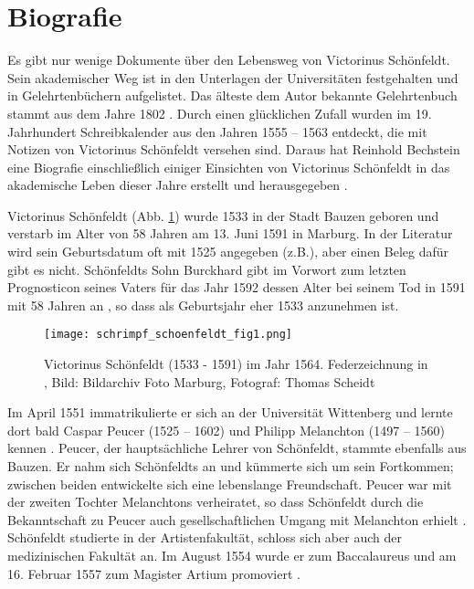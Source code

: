 \documentclass[12pt]{article}
\begin{document}
\section{Biografie}

Es gibt nur wenige Dokumente über den Lebensweg von Victorinus Schönfeldt. Sein akademischer Weg ist in den Unterlagen der Universitäten festgehalten und in Gelehrtenbüchern aufgelistet. Das älteste dem Autor bekannte Gelehrtenbuch stammt aus dem Jahre 1802 \cite{Strieder1802}. Durch einen glücklichen Zufall wurden im 19. Jahrhundert Schreibkalender aus den Jahren 1555 -- 1563 entdeckt, die mit Notizen von Victorinus Schönfeldt versehen sind. Daraus hat Reinhold Bechstein eine Biografie einschließlich einiger Einsichten von Victorinus Schönfeldt in das akademische Leben dieser Jahre erstellt und herausgegeben \cite{Bechstein1875}.

Victorinus Schönfeldt (Abb. \ref{fig_schoenfeldt_portrait}) wurde 1533 in der Stadt Bauzen geboren und verstarb im Alter von 58 Jahren am 13. Juni 1591 in Marburg. In der Literatur wird sein Geburtsdatum oft mit 1525 angegeben (z.B.\cite{Strieder1802}), aber einen Beleg dafür gibt es nicht. Schönfeldts Sohn Burckhard gibt im Vorwort zum letzten Prognosticon seines Vaters für das Jahr 1592 dessen Alter bei seinem Tod in 1591 mit 58 Jahren an \cite{Schoenfeldt1591a}, so dass als Geburtsjahr eher 1533 anzunehmen ist.

\begin{figure}[H]
	\begin{center}
	\texttt{[image: schrimpf\_schoenfeldt\_fig1.png]}
	\caption{Victorinus Schönfeldt (1533 - 1591) im Jahr 1564. Federzeichnung in \cite{Justi1888}, Bild: Bildarchiv Foto Marburg, Fotograf: Thomas Scheidt}
	\label{fig_schoenfeldt_portrait}
	\end{center}
\end{figure}


Im April 1551 immatrikulierte er sich an der Universität Wittenberg und lernte dort bald Caspar Peucer (1525 -- 1602) und Philipp Melanchton (1497 -- 1560) kennen \cite{Bechstein1875}. Peucer, der hauptsächliche Lehrer von Schönfeldt, stammte ebenfalls aus Bauzen. Er nahm sich Schönfeldts an und kümmerte sich um sein Fortkommen; zwischen beiden entwickelte sich eine lebenslange Freundschaft. Peucer war mit der zweiten Tochter Melanchtons verheiratet, so dass Schönfeldt durch die Bekanntschaft zu Peucer auch gesellschaftlichen Umgang mit Melanchton erhielt \cite{Bechstein1875}. Schönfeldt studierte in der Artistenfakultät, schloss sich aber auch der medizinischen Fakultät an. Im August 1554 wurde er zum Baccalaureus und am 16. Februar 1557 zum Magister Artium promoviert \cite{Koestlin1891}.
\end{document}
